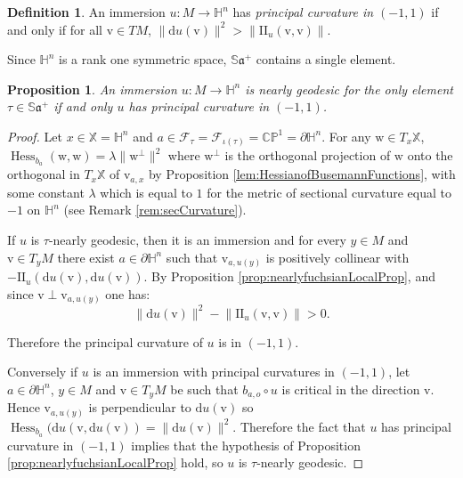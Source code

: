 \documentclass[reqno,10pt]{amsart}
\theoremstyle{plain}
\newtheorem{prop}[thm]{Proposition}
\theoremstyle{definition}
\newtheorem{defn}[thm]{Definition}
\theoremstyle{remark}
\newcommand{\type}{\tau}
\newcommand{\Sph}{\mathbb{S}}
\DeclareMathOperator{\Hess}{Hess}
\newcommand{\II}{\mathrm{I\!I}}
\newcommand{\X}{\mathbb{X}}
\begin{document}
\begin{defn}
An immersion $u:M\to \mathbb{H}^n$ has \emph{principal curvature in $(-1,1)$} if and only if for all $\mathrm{v}\in TM$, $\lVert \mathrm{d}u(\mathrm{v})\rVert^2> \lVert\II_u(\mathrm{v},\mathrm{v})\rVert$.
\end{defn}

Since $\mathbb{H}^n$ is a rank one symmetric space, $\Sph\mathfrak{a}^+$ contains a single element.

\begin{prop}
\label{prop:nearlyfuchsianH3}
An immersion $u:M\to \mathbb{H}^n$ is nearly geodesic for the only element $\type\in \Sph\mathfrak{a}^+$ if and only $u$ has principal curvature in $(-1,1)$.
\end{prop}

\begin{proof}
Let $x\in \X=\mathbb{H}^n$ and $a\in \mathcal{F}_\type=\mathcal{F}_{\iota(\type)}=\mathbb{CP}^1=\partial\mathbb{H}^n$. For any $\mathrm{w}\in T_x\X$, $\Hess_{b_a}(\mathrm{w},\mathrm{w})=\lambda\lVert\mathrm{w}^\perp\rVert^2$ where $\mathrm{w}^\perp$ is the orthogonal projection of $\mathrm{w}$ onto the orthogonal in $T_x\X$ of $\mathrm{v}_{a,x}$ by Proposition \ref{lem:HessianofBusemannFunctions}, with some constant $\lambda$  which is equal to $1$ for the metric of sectional curvature equal to $-1$ on $\mathbb{H}^n$ (see Remark \ref{rem:secCurvature}).

If $u$ is $\type$-nearly geodesic, then it is an immersion and for every $y\in M$ and $\mathrm{v}\in T_yM$ there exist $a\in \partial \mathbb{H}^n$ such that $\mathrm{v}_{a,u(y)}$ is positively collinear with $-\II_u\left(\mathrm{d}u(\mathrm{v}),\mathrm{d}u(\mathrm{v})\right)$. By Proposition \ref{prop:nearlyfuchsianLocalProp}, and since $\mathrm{v}\perp\mathrm{v}_{a,u(y)}$ one has:
$$\lVert \mathrm{d}u(\mathrm{v})\rVert^2-\lVert\II_u(\mathrm{v},\mathrm{v})\rVert>0.$$

Therefore the principal curvature of $u$ is in $(-1,1)$.

\medskip

Conversely if $u$ is an immersion with principal curvatures in $(-1,1)$, let $a\in \partial\mathbb{H}^n$, $y\in M$ and $\mathrm{v}\in T_yM$ be such that $b_{a,o}\circ u$ is critical in the direction $\mathrm{v}$. Hence $\mathrm{v}_{a,u(y)}$ is perpendicular to $\mathrm{d}u(\mathrm{v})$ so $\Hess_{b_a}(\mathrm{d}u(\mathrm{v},\mathrm{d}u(\mathrm{v}))=\lVert \mathrm{d}u(\mathrm{v})\rVert^2$. Therefore the fact that $u$ has principal curvature in $(-1,1)$ implies that the hypothesis of Proposition \ref{prop:nearlyfuchsianLocalProp} hold, so $u$ is $\type$-nearly geodesic.
\end{proof}
\end{document}
